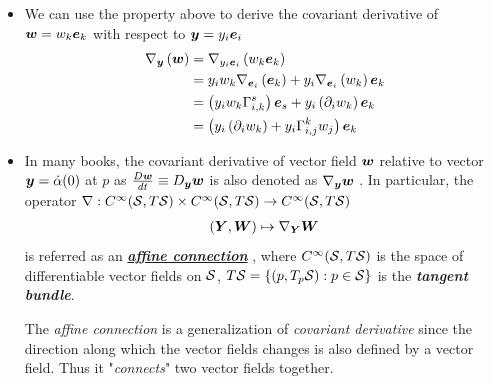 \documentclass[11pt]{article}
\begin{document}
\begin{itemize}
\item We can use the property above to derive the covariant derivative of $\boldsymbol{w} = w_{k}\boldsymbol{e}_{k}$ with respect to $\boldsymbol{y} = y_{i}\boldsymbol{e}_{i}$
\begin{align*}
\nabla_{\boldsymbol{y}}\left(\boldsymbol{w}\right) &= \nabla_{y_{i}\boldsymbol{e}_{i}}\left(w_{k}\boldsymbol{e}_{k}\right)\\
&= y_{i}w_{k}\nabla_{\boldsymbol{e}_{i}}\left(\boldsymbol{e}_{k}\right) +y_{i}\nabla_{\boldsymbol{e}_{i}}\left(w_{k}\right)\boldsymbol{e}_{k} \\
&= \left(y_{i}w_{k}\Gamma_{i,k}^{s}\right)\boldsymbol{e}_{s}+y_{i}\left(\partial_{i}w_{k}\right)\boldsymbol{e}_{k}\\
&= \left(y_{i}\left(\partial_{i}w_{k}\right) + y_{i}\Gamma_{i,j}^{k}w_{j}  \right)\boldsymbol{e}_{k}
\end{align*}

\item In many books, the covariant derivative of vector field $\boldsymbol{w}$ relative to vector $\boldsymbol{y} = \dot{\alpha}(0)$ at $p$ as $\frac{D\boldsymbol{w}}{dt} \equiv D_{\boldsymbol{y}}\boldsymbol{w}$ is also denoted as $\nabla_{\boldsymbol{y}}\boldsymbol{w}$ \citep{do1992riemannian}. In particular, the operator $\nabla: C^{\infty}({\mathcal S}, T{\mathcal S}) \times C^{\infty}({\mathcal S}, T{\mathcal S})\rightarrow C^{\infty}({\mathcal S}, T{\mathcal S})$ 
\begin{align*}
(\boldsymbol{Y}, \boldsymbol{W})\mapsto \nabla_{\boldsymbol{Y}}\boldsymbol{W}
\end{align*} is referred as an \underline{\emph{\textbf{affine connection}}} \citep{do1992riemannian, murray1993differential}, where $C^{\infty}({\mathcal S}, T{\mathcal S})$ is the space of differentiable vector fields on ${\mathcal S}$, $T{\mathcal S} = \left\{(p,T_{p}{\mathcal S}): p\in {\mathcal S}\right\}$ is the \emph{\textbf{tangent bundle}}. 

The \emph{affine connection} is a generalization of \emph{covariant derivative} since the direction along which the vector fields changes is also defined by a vector field. Thus it "\emph{connects}" two vector fields together.
\end{itemize}
\end{document}
